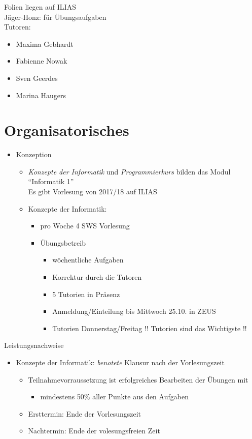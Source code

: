 \documentclass{gadsescript}
\begin{document}
\maketitle

Folien liegen auf ILIAS\\
Jäger-Honz: für Übungsaufgaben\\

Tutoren:
\begin{itemize}
	\item Maxima Gebhardt
	\item Fabienne Nowak
	\item Sven Geerdes
	\item Marina Haugers
\end{itemize}

\section{Organisatorisches}
\begin{itemize}
	\item Konzeption
		\begin{itemize}
			\item \textit{Konzepte der Informatik} und \textit{Programmierkurs} bilden das Modul ``Informatik 1''\\
				Es gibt Vorlesung von 2017/18 auf ILIAS
			\item Konzepte der Informatik:
				\begin{itemize}
					\item pro Woche 4 SWS Vorlesung
					\item Übungsbetreib
						\begin{itemize}
							\item wöchentliche Aufgaben
							\item Korrektur durch die Tutoren
							\item 5 Tutorien in Präsenz
							\item Anmeldung/Einteilung bis Mittwoch 25.10. in ZEUS
							\item Tutorien Donnerstag/Freitag !! Tutorien sind das Wichtigste !!
						\end{itemize}
				\end{itemize}
		\end{itemize}
\end{itemize}

Leistungsnachweise
\begin{itemize}
	\item Konzepte der Informatik: \textit{benotete} Klausur nach der Vorlesungszeit
		\begin{itemize}
			\item Teilnahmevorraussetzung ist erfolgreiches Bearbeiten der Übungen mit
				\begin{itemize}
					\item mindestens 50\% aller Punkte aus den Aufgaben
				\end{itemize}
			\item Ersttermin: Ende der Vorlesungszeit
			\item Nachtermin: Ende der volesungsfreien Zeit
		\end{itemize}
\end{itemize}
\end{document}
